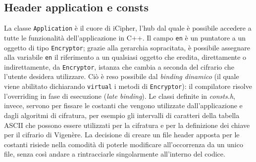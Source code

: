 \documentclass[a4paper, 12pt, one column, aas_macros]{article}
\begin{document}
	\subsection{Header application e consts}
	La classe \verb|Application| è il cuore di iCipher, l'hub dal quale è possibile accedere a tutte le funzionalità dell'applicazione in C++. Il campo \verb|en| è un puntatore a un oggetto di tipo \verb|Encryptor|; grazie alla gerarchia sopracitata, è possibile assegnare alla variabile \verb|en| il riferimento a un qualsiasi oggetto che eredita, direttamente o indirettamente, da \verb|Encryptor|, istanza che cambia a seconda del cifrario che l'utente desidera utilizzare. Ciò è reso possibile dal \textit{binding dinamico} (il quale viene abilitato dichiarando \verb|virtual| i metodi di \verb|Encryptor|): il compilatore risolve l'overriding in fase di esecuzione (\textit{late binding}). Le classi definite in \textit{consts.h}, invece, servono per fissare le costanti che vengono utilizzate dall'applicazione e dagli algoritmi di cifratura, per esempio gli intervalli di caratteri della tabella ASCII che possono essere utilizzati per la cifratura e per la definizione dei chiave per il cifrario di Vigenère. La decisione di creare un file header apposta per le costanti risiede nella comodità di poterle modificare all'occorrenza da un unico file, senza così andare a rintracciarle singolarmente all'interno del codice. 
\end{document}
